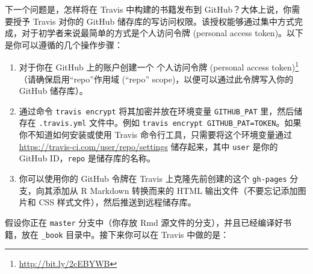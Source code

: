 \documentclass[
  12pt,
]{krantz}
\newenvironment{Shaded}{\begin{snugshade}}{\end{snugshade}}
\newcommand{\AttributeTok}[1]{\textcolor[rgb]{0.13,0.29,0.53}{#1}}
\newcommand{\BuiltInTok}[1]{#1}
\newcommand{\CommentTok}[1]{\textcolor[rgb]{0.56,0.35,0.01}{\textit{#1}}}
\newcommand{\DataTypeTok}[1]{\textcolor[rgb]{0.13,0.29,0.53}{#1}}
\newcommand{\FunctionTok}[1]{\textcolor[rgb]{0.13,0.29,0.53}{\textbf{#1}}}
\newcommand{\NormalTok}[1]{#1}
\newcommand{\PreprocessorTok}[1]{\textcolor[rgb]{0.56,0.35,0.01}{\textit{#1}}}
\newcommand{\StringTok}[1]{\textcolor[rgb]{0.31,0.60,0.02}{#1}}
\newcommand{\VariableTok}[1]{\textcolor[rgb]{0.00,0.00,0.00}{#1}}
\providecommand{\tightlist}{%
  \setlength{\itemsep}{0pt}\setlength{\parskip}{0pt}}
\renewcommand{\href}[2]{#2\footnote{\url{#1}}}
\theoremstyle{definition}
\theoremstyle{definition}
\theoremstyle{definition}
\theoremstyle{definition}
\theoremstyle{remark}
\begin{document}
下一个问题是，怎样将在 Travis 中构建的书籍发布到 GitHub？大体上说，你需要授予 Travis 对你的 GitHub 储存库的写访问权限。该授权能够通过集中方式完成，对于初学者来说最简单的方式是个人访问令牌 (personal access token)。以下是你可以遵循的几个操作步骤：

\begin{enumerate}
\def\labelenumi{\arabic{enumi}.}
\tightlist
\item
  对于你在 GitHub 上的账户创建一个 \href{http://bit.ly/2cEBYWB}{个人访问令牌 (personal access token)}（请确保启用``repo''作用域 (``repo'' scope)，以便可以通过此令牌写入你的 GitHub 储存库）。
\item
  通过命令 \texttt{travis\ encrypt} 将其加密并放在环境变量 \texttt{GITHUB\_PAT} 里，然后储存在 \texttt{.travis.yml} 文件中。例如 \texttt{travis\ encrypt\ GITHUB\_PAT=TOKEN}。如果你不知道如何安装或使用 Travis 命令行工具，只需要将这个环境变量通过 \url{https://travis-ci.com/user/repo/settings} 储存起来，其中 \texttt{user} 是你的 GitHub ID，\texttt{repo} 是储存库的名称。
\item
  你可以使用你的 GitHub 令牌在 Travis 上克隆先前创建的这个 \texttt{gh-pages} 分支，向其添加从 R Markdown 转换而来的 HTML 输出文件（不要忘记添加图片和 CSS 样式文件），然后推送到远程储存库。
\end{enumerate}

假设你正在 \texttt{master} 分支中（你存放 Rmd 源文件的分支），并且已经编译好书籍，放在 \texttt{\_book} 目录中。接下来你可以在 Travis 中做的是：

\begin{Shaded}
\end{Shaded}
\end{document}
